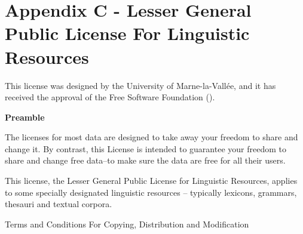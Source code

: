 \chapter*{Appendix C - Lesser General Public License For Linguistic Resources}
\noindent
This license was designed by the University of Marne-la-Vall\'ee, and it has
received the approval of the Free Software Foundation (\cite{FSF}).

\bigskip

\bigskip

\begin{center}
{\bf\large Preamble}
\end{center}

The licenses for most data are designed to take away your freedom to share and change it. 
By contrast, this License is intended to guarantee your freedom to share and change free 
data--to make sure the data are free for all their users.

This license, the Lesser General Public License for Linguistic Resources, applies to some 
specially designated linguistic resources -- typically lexicons, grammars, thesauri and 
textual corpora.

\begin{center}
{\Large \sc Terms and Conditions For Copying, Distribution and Modification}
\end{center}



